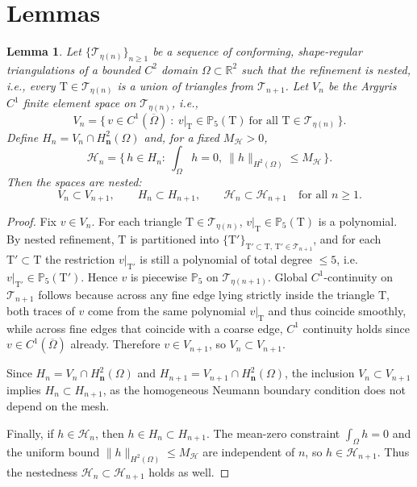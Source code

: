 \documentclass[11pt]{article}
\newtheorem{lemma}{Lemma}
\begin{document}
	
	\section{Lemmas}\label{appendix:lemmas}
	
	\begin{lemma}\label{lemma:nested}
		Let $\{\mathcal{T}_{\eta(n)}\}_{n\ge 1}$ be a sequence of conforming, shape-regular triangulations of a bounded $C^2$ domain $\Omega\subset\mathbb R^2$ such that the refinement is nested, i.e., every $\text{T}\in\mathcal{T}_{\eta(n)}$ is a union of triangles from $\mathcal T_{n+1}$. 
		Let $V_n$ be the Argyris $C^1$ finite element space on $\mathcal{T}_{\eta(n)}$, i.e.,
		\[
		V_n = \Big\{\, v\in C^1(\overline\Omega)\ :\ v|_\text{T}\in\mathbb P_5(\text{T})\ \text{for all }\text{T}\in\mathcal{T}_{\eta(n)} \,\Big\}.
		\]
		Define $H_n=V_n\cap H^2_{\mathbf n}(\Omega)$ and, for a fixed $M_{\mathcal H}>0$,
		\[
		\mathcal H_n = \Big\{\, h\in H_n:\ \int_\Omega h=0,\ \|h\|_{H^2(\Omega)}\le M_{\mathcal H}\,\Big\}.
		\]
		Then the spaces are nested:
		\[
		V_n \subset V_{n+1},\qquad H_n\subset H_{n+1},\qquad \mathcal H_n \subset \mathcal H_{n+1}\quad \text{for all } n\ge 1.
		\]
	\end{lemma}
	
	\begin{proof}
		Fix $v\in V_n$. For each triangle $\text{T}\in\mathcal{T}_{\eta(n)}$, $v|_\text{T}\in\mathbb P_5(\text{T})$ is a polynomial. By nested refinement, $\text{T}$ is partitioned into $\{\text{T}'\}_{\text{T}'\subset \text{T},\,\text{T}'\in\mathcal T_{n+1}}$, and for each $\text{T}'\subset \text{T}$ the restriction $v|_{\text{T}'}$ is still a polynomial of total degree $\le 5$, i.e.\ $v|_{\text{T}'}\in\mathbb P_5(\text{T}')$. Hence $v$ is piecewise $\mathbb P_5$ on $\mathcal T_{\eta(n+1)}$. Global $C^1$-continuity on $\mathcal T_{n+1}$ follows because across any fine edge lying strictly inside the triangle $\text{T}$, both traces of $v$ come from the same polynomial $v|_\text{T}$ and thus coincide smoothly, while across fine edges that coincide with a coarse edge, $C^1$ continuity holds since $v\in C^1(\overline\Omega)$ already. Therefore $v\in V_{n+1}$, so $V_n\subset V_{n+1}$.
		
		Since $H_n=V_n\cap H^2_{\mathbf n}(\Omega)$ and $H_{n+1}=V_{n+1}\cap H^2_{\mathbf n}(\Omega)$, the inclusion $V_n\subset V_{n+1}$ implies $H_n\subset H_{n+1}$, as the homogeneous Neumann boundary condition does not depend on the mesh.
		
		Finally, if $h\in\mathcal H_n$, then $h\in H_n\subset H_{n+1}$. The mean-zero constraint $\int_\Omega h=0$ and the uniform bound $\|h\|_{H^2(\Omega)}\le M_{\mathcal H}$ are independent of $n$, so $h\in\mathcal H_{n+1}$. Thus the nestedness $\mathcal H_n\subset\mathcal H_{n+1}$ holds as well.
	\end{proof}
	
\end{document}
